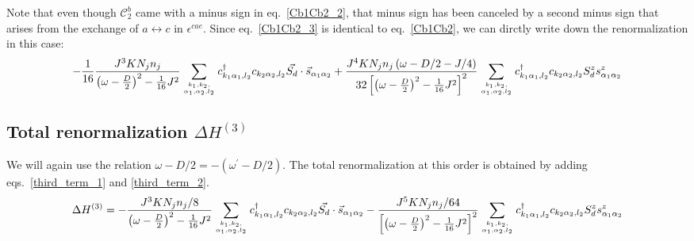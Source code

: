 \documentclass{revtex4-2}
\numberwithin{equation}{section}
\begin{document}
Note that even though \(\mathcal{C}^b_2\) came with a minus sign in eq.~\ref{Cb1Cb2_2}, that minus sign has been canceled by a second minus sign that arises from the exchange of \(a \leftrightarrow c\) in \(\epsilon^{cae}\). Since eq.~\ref{Cb1Cb2_3} is identical to eq.~\ref{Cb1Cb2}, we can dirctly write down the renormalization in this case:
\begin{equation}\begin{aligned}
	\label{third_term_2}
	-\frac{1}{16}\frac{J^3 K N_j n_j }{\left(\omega - \frac{D}{2}\right)^2 - \frac{1}{16}J^2}\sum_{k_1,k_2,\atop{\alpha_1,\alpha_2,l_2}}c^\dagger_{k_1\alpha_1,l_2}c_{k_2 \alpha_2,l_2} \vec{S_d}\cdot\vec{s}_{\alpha_1\alpha_2} + \frac{J^4 K N_j n_j \left( \omega - D/2 - J/4 \right) }{32\left[\left(\omega - \frac{D}{2}\right)^2 - \frac{1}{16}J^2\right]^2}\sum_{k_1,k_2,\atop{\alpha_1,\alpha_2,l_2}} c^\dagger_{k_1 \alpha_1,l_2}c_{k_2 \alpha_2,l_2}S_d^z s^z_{\alpha_1\alpha_2}
\end{aligned}\end{equation}

\subsection{Total renormalization \(\Delta H^{(3)}\)}
We will again use the relation \(\omega - D/2 = -(\omega^\prime - D/2)\). The total renormalization at this order is obtained by adding eqs.~\ref{third_term_1} and \ref{third_term_2}.
\begin{equation}\begin{aligned}
	\Delta H^{(3)} = -\frac{J^3 K N_j n_j / 8}{\left(\omega - \frac{D}{2}\right)^2 - \frac{1}{16}J^2}\sum_{k_1,k_2,\atop{\alpha_1,\alpha_2,l_2}}c^\dagger_{k_1\alpha_1,l_2}c_{k_2 \alpha_2,l_2} \vec{S_d}\cdot\vec{s}_{\alpha_1\alpha_2} - \frac{J^5 K N_j n_j / 64}{\left[\left(\omega - \frac{D}{2}\right)^2 - \frac{1}{16}J^2\right]^2}\sum_{k_1,k_2,\atop{\alpha_1,\alpha_2,l_2}} c^\dagger_{k_1 \alpha_1,l_2}c_{k_2 \alpha_2,l_2}S_d^z s^z_{\alpha_1\alpha_2}
\end{aligned}\end{equation}
\end{document}
